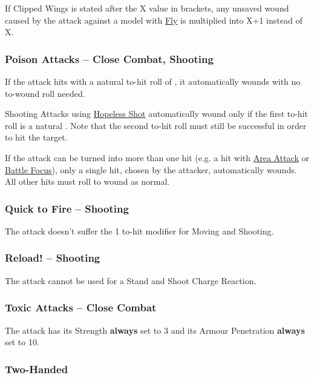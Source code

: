 If Clipped Wings is stated after the X value in brackets, any unsaved wound caused by the attack against a model with \hyperref[fly]{Fly} is multiplied into X+1 instead of X.

\subsubsection{Poison Attacks -- Close Combat, Shooting}
\idx[main=y]{\poisonattacks}\label{poison_attacks}

If the attack hits with a natural to-hit roll of , it automatically wounds with no to-wound roll needed.

Shooting Attacks using \hyperref[hopeless_shots]{Hopeless Shot} automatically wound only if the first to-hit roll is a natural . Note that the second to-hit roll must still be successful in order to hit the target.

If the attack can be turned into more than one hit (e.g. a hit with \hyperref[area_attack]{Area Attack} or \hyperref[battle_focus]{Battle Focus}), only a single hit, chosen by the attacker,  automatically wounds. All other hits must roll to wound as normal.

\subsubsection{Quick to Fire -- Shooting}
\idx[main=y]{\quicktofire}\label{quick_to_fire}

The attack doesn't suffer the \minuss{}1 to-hit modifier for Moving and Shooting.

\subsubsection{Reload! -- Shooting}
\label{reload}

The attack cannot be used for a Stand and Shoot Charge Reaction.

\subsubsection{Toxic Attacks -- Close Combat}
\idx[main=y]{\toxicattacks}\label{toxic_attacks}

The attack has its Strength \textbf{always} set to 3 and its Armour Penetration \textbf{always} set to 10.

\subsubsection{Two-Handed}
\idx[main=y]{\twohanded}\label{twohanded}

